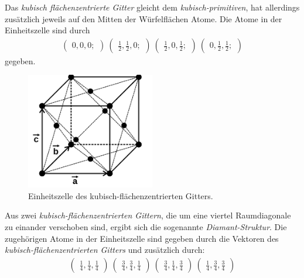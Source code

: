 Das \textit{kubisch flächenzentrierte Gitter} gleicht dem
\textit{kubisch-primitiven}, hat
allerdings zusätzlich jeweils auf den Mitten der Würfelflächen Atome.
Die Atome in der Einheitszelle sind durch
\begin{align}
\label{eqn:3*}
\begin{pmatrix}
0, 0, 0;
\end{pmatrix}\
\begin{pmatrix}
\frac{1}{2}, \frac{1}{2}, 0;
\end{pmatrix}\
\begin{pmatrix}
\frac{1}{2}, 0, \frac{1}{2};
\end{pmatrix}\
\begin{pmatrix}
0, \frac{1}{2}, \frac{1}{2};
\end{pmatrix}
\end{align}
gegeben.

\begin{figure}[hhh]
\centering
\includegraphics[width=0.5\textwidth]{abbildungen/fcc.png}
\caption{Einheitszelle des kubisch-flächenzentrierten Gitters.\cite{sample}}
\label{fig:fcc}
\end{figure}

Aus zwei \textit{kubisch-flächenzentrierten Gittern}, die
um eine viertel Raumdiagonale zu einander verschoben sind, ergibt sich die sogenannte
\textit{Diamant-Struktur}.
Die zugehörigen Atome in der Einheitszelle sind gegeben durch die
Vektoren des \textit{kubisch-flächenzentrierten Gitters}
und zusätzlich durch:
\begin{align}
\label{eqn:4*}
\begin{pmatrix}
\frac{1}{4}, \frac{1}{4}, \frac{1}{4}
\end{pmatrix}\
\begin{pmatrix}
\frac{3}{4}, \frac{3}{4}, \frac{1}{4}
\end{pmatrix}\
\begin{pmatrix}
\frac{3}{4}, \frac{1}{4}, \frac{3}{4}
\end{pmatrix}\
\begin{pmatrix}
\frac{1}{4}, \frac{3}{4}, \frac{3}{4}
\end{pmatrix}
\end{align}

